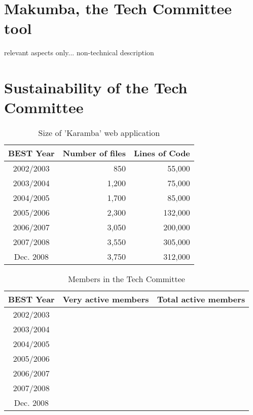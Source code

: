 \documentclass{acm_proc_article-sp}
\begin{document}
\section{Makumba, the Tech Committee tool}\label{sec:makumba}
relevant aspects only... non-technical description

\section{Sustainability of the Tech Committee}
\begin{itemize}

\begin{table}\label{tab:karamba}
	\centering
	\caption{Size of 'Karamba' web application}
	\begin{tabular}{c|r|r}
		\hline
		\hline
		BEST Year 		& Number of files 	& Lines of Code\\
		\hline
		\hline
		2002/2003		& 850				& 55,000 \\
		\hline
		2003/2004		& 1,200				& 75,000 \\
		\hline
		2004/2005		& 1,700				& 85,000 \\
		\hline
		2005/2006		& 2,300				& 132,000 \\
		\hline
		2006/2007		& 3,050				& 200,000 \\
		\hline
		2007/2008		& 3,550				& 305,000 \\
		\hline
		Dec. 2008		& 3,750				& 312,000 \\
		\hline
		\hline
	\end{tabular}
\end{table} 


\begin{table}\label{tab:itd-members}
	\centering
	\caption{Members in the Tech Committee}
	\begin{tabular}{c|r|r}
		\hline
		\hline
		BEST Year 		& Very active members 	& Total active members 	\\
		\hline
		\hline
		2002/2003		& 						&  \\
		\hline
		2003/2004		& 						&  \\
		\hline
		2004/2005		& 						&  \\
		\hline
		2005/2006		& 						&  \\
		\hline
		2006/2007		& 						&  \\
		\hline
		2007/2008		& 						&  \\
		\hline
		Dec. 2008		& 						&  \\
		\hline
		\hline
	\end{tabular}
\end{table} 


\end{itemize}
\end{document}
